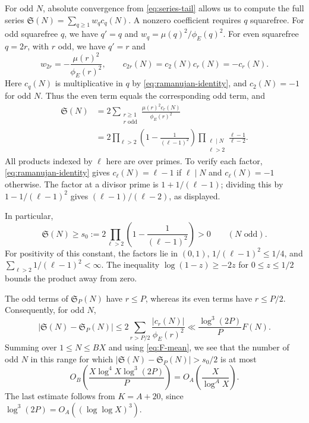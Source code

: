 \documentclass[11pt,letterpaper]{article}
\numberwithin{equation}{section}
\theoremstyle{remark}
\newcommand{\tot}{\phi_{\!E}}
\begin{document}
For odd $N$, absolute convergence from \eqref{eq:series-tail}
allows us to compute the full series
$\mathfrak S(N)=\sum_{q\ge1}w_qc_q(N)$. A nonzero coefficient
requires $q$ squarefree. For odd squarefree $q$, we have $q'=q$
and $w_q=\mu(q)^2/\tot(q)^2$. For even squarefree $q=2r$,
with $r$ odd, we have $q'=r$ and
\[
 w_{2r}=-\frac{\mu(r)^2}{\tot(r)^2},\qquad
 c_{2r}(N)=c_2(N)c_r(N)=-c_r(N).
\]
Here $c_q(N)$ is multiplicative in $q$ by
\eqref{eq:ramanujan-identity}, and $c_2(N)=-1$ for odd $N$.
Thus the even term equals the corresponding odd term, and
\begin{equation}\label{eq:full-series}
 \begin{aligned}
 \mathfrak S(N)
 &=2\sum_{\substack{r\ge1\\r\text{ odd}}}
               \frac{\mu(r)^2c_r(N)}{\tot(r)^2}\\
 &=2\prod_{\ell>2}
             \left(1-\frac1{(\ell-1)^2}\right)
       \prod_{\substack{\ell\mid N\\\ell>2}}
             \frac{\ell-1}{\ell-2}.
 \end{aligned}
\end{equation}
All products indexed by $\ell$ here are over primes. To verify
each factor, \eqref{eq:ramanujan-identity} gives
$c_\ell(N)=\ell-1$ if $\ell\mid N$ and $c_\ell(N)=-1$ otherwise.
The factor at a divisor prime is $1+1/(\ell-1)$; dividing this by
$1-1/(\ell-1)^2$ gives $(\ell-1)/(\ell-2)$, as displayed.

In particular,
\begin{equation}\label{eq:s0}
 \mathfrak S(N)\ge s_0:=
 2\prod_{\ell>2}\left(1-\frac1{(\ell-1)^2}\right)>0
 \qquad(N\text{ odd}).
\end{equation}
For positivity of this constant, the factors lie in $(0,1)$,
$1/(\ell-1)^2\le1/4$, and
$\sum_{\ell>2}1/(\ell-1)^2<\infty$. The inequality
$\log(1-z)\ge-2z$ for $0\le z\le1/2$ bounds the product away
from zero.

The odd terms of $\mathfrak S_P(N)$ have $r\le P$, whereas its
even terms have $r\le P/2$. Consequently, for odd $N$,
\[
 |\mathfrak S(N)-\mathfrak S_P(N)|
 \le2\sum_{r>P/2}\frac{|c_r(N)|}{\tot(r)^2}
 \ll\frac{\log^3(2P)}P F(N).
\]
Summing over $1\le N\le BX$ and using \eqref{eq:F-mean}, we see
that the number of odd $N$ in this range for which
$|\mathfrak S(N)-\mathfrak S_P(N)|>s_0/2$ is at most
\begin{equation}\label{eq:series-exceptions}
 O_B\left(\frac{X\log^4X\log^3(2P)}P\right)
 =O_A\left(\frac{X}{\log^A X}\right).
\end{equation}
The last estimate follows from $K=A+20$, since
$\log^3(2P)=O_A((\log\log X)^3)$.
\end{document}
